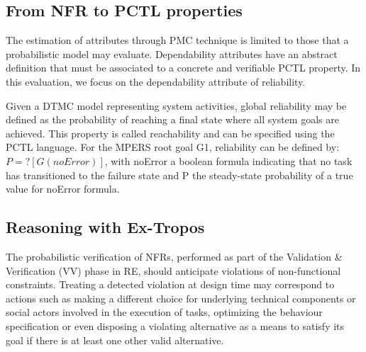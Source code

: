 \subsection{From NFR to PCTL properties}

The estimation of attributes through PMC technique is limited to those that a probabilistic model may evaluate. Dependability attributes have an abstract definition that must be associated to a concrete and verifiable PCTL property. In this evaluation, we focus on the dependability attribute of reliability. 

Given a DTMC model representing system activities, global reliability may be defined as the probability of reaching a final state where all system goals are achieved. This property is called reachability and can be specified using the PCTL language. For the MPERS root goal G1, reliability can be defined by: $ P=? [ G (noError) ] $, with noError a boolean formula indicating that no task has transitioned to the failure state and P the steady-state probability of a true value for noError formula.


%
%
%




\subsection{Reasoning with Ex-Tropos}

The probabilistic verification of NFRs, performed as part of the Validation \& Verification (VV) phase in RE, should anticipate violations of non-functional constraints. Treating a detected violation at design time may correspond to actions such as making a different choice for underlying technical components or social actors involved in the execution of tasks, optimizing the behaviour specification or even disposing a violating alternative as a means to satisfy its goal if there is at least one other valid alternative. 

